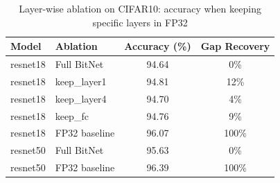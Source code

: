 \begin{table}[h]
\centering
\caption{Layer-wise ablation on CIFAR10: accuracy when keeping specific layers in FP32}
\label{tab:layer_ablation_cifar10}
\begin{tabular}{llcc}
\toprule
Model & Ablation & Accuracy (\%) & Gap Recovery \\
\midrule
resnet18 & Full BitNet & 94.64 & 0\% \\
resnet18 & keep\_layer1 & 94.81 & 12\% \\
resnet18 & keep\_layer4 & 94.70 & 4\% \\
resnet18 & keep\_fc & 94.76 & 9\% \\
resnet18 & FP32 baseline & 96.07 & 100\% \\
\midrule
resnet50 & Full BitNet & 95.63 & 0\% \\
resnet50 & FP32 baseline & 96.39 & 100\% \\
\bottomrule
\end{tabular}
\end{table}